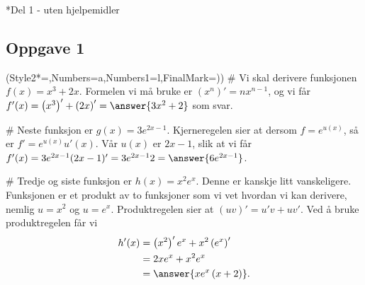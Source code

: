 


\newcommand{\fagkode}{S2}
\newcommand{\semesteraar}{høsten 2015}
\newcommand{\forfatter}{Tommy O.}
\newcommand{\dokumenttittel}{Løsningsforslag -- Eksamen \fagkode, \semesteraar}


\newcommand{\logonavn}




\section*{Del 1 - uten hjelpemidler}
\subsection*{Oppgave 1}
\begin{easylist}[enumerate]
	\ListProperties(Style2*=,Numbers=a,Numbers1=l,FinalMark={)})
	# Vi skal derivere funksjonen $f(x) = x^3 + 2x$.
	Formelen vi må bruke er $(x^n)' = nx^{n-1}$, og vi får $f'(x) = \left(x^3\right)' + \left(2x\right)' = \answer{3x^2 + 2}$ som svar.

	# Neste funksjon er $g(x) = 3e^{2x-1}$.
	Kjerneregelen sier at dersom $f = e^{u(x)}$, så er $f' = e^{u(x)} u'(x)$.
	Vår $u(x)$ er $ 2x-1$, slik at vi får $f'(x) = 3e^{2x-1} (2x-1)' = 3e^{2x-1} 2 = \answer{6e^{2x-1}}$.
	
	# Tredje og siste funksjon er $h(x) = x^2e^x$.
	Denne er kanskje litt vanskeligere. Funksjonen er et produkt av to funksjoner som vi vet hvordan vi  kan derivere, nemlig $u = x^2$ og $u = e^x$.
	Produktregelen sier at $(uv)' = u'v + uv'$. Ved å bruke produktregelen får vi
	\begin{align*}
		h'(x) &= \left(x^2\right)'  e^x + x^2\left(e^x\right)' \\
			&= 2x  e^x + x^2e^x \\
			&= \answer{xe^x\left(x+2\right)}.
	\end{align*}
\end{easylist}

